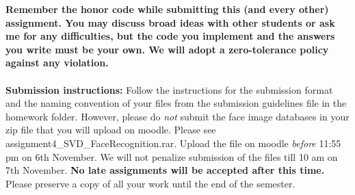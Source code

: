 \documentclass[11pt]{article}
\begin{document}
\maketitle

\textbf{Remember the honor code while submitting this (and every other) assignment. You may discuss broad ideas with other students or ask me for any difficulties, but the code you implement and the answers you write must be your own. We will adopt a \textbf{zero-tolerance policy} against any violation.}
\\
\\
\textbf{Submission instructions:} Follow the instructions for the submission format and the naming convention of your files from the submission guidelines file in the homework folder. However, please do \emph{not} submit the face image databases in your zip file that you will upload on moodle. Please see \textsf{assignment4\_SVD\_FaceRecognition.rar}. Upload the file on moodle \emph{before} 11:55 pm on 6th November.  We will not penalize submission of the files till 10 am on 7th November. \textbf{No late assignments will be accepted after this time.} Please preserve a copy of all your work until the end of the semester.  
\end{document}
